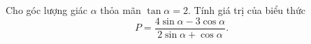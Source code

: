 \begin{ex}
Cho góc lượng giác $\alpha$ thỏa mãn $\tan\alpha=2$. Tính giá trị của biểu thức
\[P=\dfrac{4\sin\alpha-3\cos\alpha}{2\sin\alpha+\cos\alpha}.\]
\end{ex}

